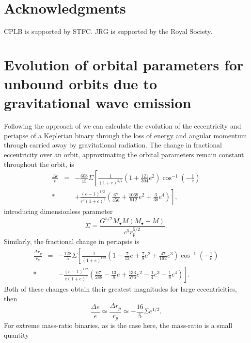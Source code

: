 \documentclass[useAMS,usedcolumn,usegraphicx,usenatbib]{mn2e}
\newcommand{\recip}[1]{\ensuremath{\frac{1}{#1}}}
\begin{document}
\section*{Acknowledgments}
CPLB is supported by STFC. JRG is supported by the Royal Society.




\appendix

\section[]{Evolution of orbital parameters for unbound orbits due to gravitational wave emission}\label{sec:Unbound}

Following the approach of \citet{Turner1977} we can calculate the evolution of the eccentricity and periapse of a Keplerian binary through the loss of energy and angular momentum through carried away by gravitational radiation. The change in fractional eccentricity over an orbit, approximating the orbital parameters remain constant throughout the orbit, is
\begin{eqnarray}
\frac{\Delta e}{e} &=& -\frac{608}{15}\Sigma\left[\recip{(1+e)^{5/2}}\left(1 + \frac{121}{304}e^2\right)\cos^{-1}\left(-\recip{e}\right)\right. \nonumber\\*
 & & \left. + \frac{(e - 1)^{1/2}}{e^2(1+e)^2}\left(\frac{67}{456} + \frac{1069}{912}e^2 + \frac{3}{38}e^4\right)\right],
\end{eqnarray}
introducing dimensionless parameter
\begin{equation}
\Sigma = \frac{G^{5/2}M_\bullet M(M_\bullet+ M)}{c^5r_p^{5/2}}.
\end{equation}
Similarly, the fractional change in periapsis is
\begin{eqnarray}
\frac{\Delta r_p}{r_p} &=& -\frac{128}{5}\Sigma\left[\recip{(1+e)^{7/2}}\left(1 - \frac{7}{12}e + \frac{7}{8}e^2 + \frac{47}{192}e^3\right)\cos^{-1}\left(-\recip{e}\right)\right. \nonumber \\*
 & & \left. - \frac{(e - 1)^{1/2}}{e(1 + e)^3}\left(\frac{67}{288} - \frac{13}{8}e + \frac{133}{576}e^2 - \frac{1}{4}e^3 - \frac{1}{8}e^4\right)\right].
\end{eqnarray}
Both of these changes obtain their greatest magnitudes for large eccentricities, then
\begin{equation}
\frac{\Delta e}{e} \simeq \frac{\Delta r_p}{r_p} \simeq -\frac{16}{5}\Sigma e^{1/2}.
\end{equation}
For extreme mass-ratio binaries, as is the case here, the mass-ratio is a small quantity
\end{document}
